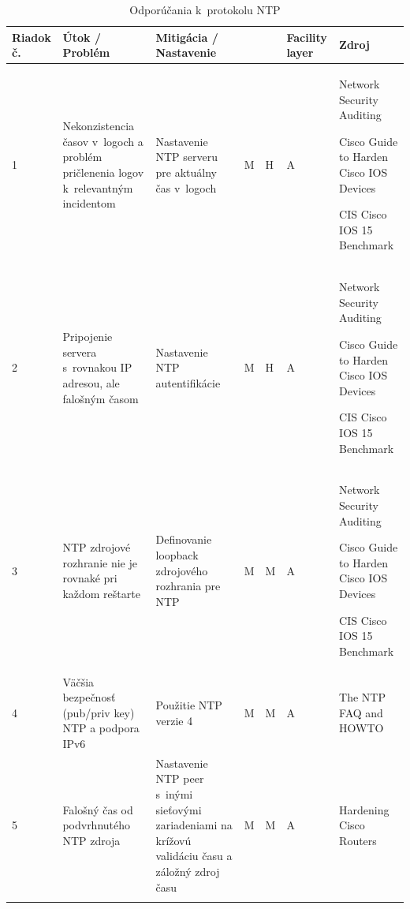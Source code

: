 \begin{longtable}[!htbp]{|C{2.5em}L{9em}L{9em}C{2em}C{2.5em}C{7.5em}L{10em}|}
	
	\hline
	\centering
	
	Riadok č.	&Útok / Problém	&Mitigácia / Nastavenie	& 	&	&Facility layer	&Zdroj\\
	\endhead

	 1	&Nekonzistencia časov v~logoch a problém pričlenenia logov k~relevantným incidentom	&Nastavenie NTP serveru pre aktuálny čas v~logoch	&M	&H	&A	&Network Security Auditing \cite{Jackson2010}
	
	Cisco Guide to Harden Cisco IOS Devices \cite{Singh2018}
	
	CIS Cisco IOS 15 Benchmark \cite{CIS_DrTLsgXv24lxeIIM}\\
	2	&Pripojenie servera s~rovnakou IP adresou, ale falošným časom	&Nastavenie NTP autentifikácie	&M	&H	&A	&Network Security Auditing \cite{Jackson2010}
	
	Cisco Guide to Harden Cisco IOS Devices \cite{Singh2018}
	
	CIS Cisco IOS 15 Benchmark \cite{CIS_DrTLsgXv24lxeIIM}\\
	 3	&NTP zdrojové rozhranie nie je rovnaké pri každom reštarte	& Definovanie loopback zdrojového rozhrania pre NTP	&M	&M	&A	&Network Security Auditing \cite{Jackson2010}
	
	Cisco Guide to Harden Cisco IOS Devices \cite{Singh2018}
	
	CIS Cisco IOS 15 Benchmark \cite{CIS_DrTLsgXv24lxeIIM}\\
	4	&Väčšia bezpečnosť (pub/priv key) NTP a podpora IPv6	&Použitie NTP verzie 4	&M	&M	&A	&The NTP FAQ and HOWTO \cite{s0goWNnWp5OjqREE}\\
	 5	&Falošný čas od podvrhnutého NTP zdroja	&Nastavenie NTP peer s~inými sieťovými zariadeniami na krížovú validáciu času a záložný zdroj času	&M	&M	&A	&Hardening Cisco Routers \cite{Akin2002}\\
	
	\hline
	\caption{Odporúčania k~protokolu NTP}
	\label{tab:ntp}%
\end{longtable}%

